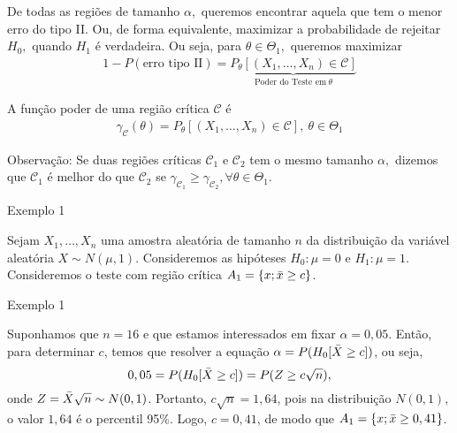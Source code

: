 \documentclass[12pt]{beamer}
\begin{document}
\begin{frame}{}
\begin{block}{}
\justifying
De todas as regiões de tamanho $\alpha,$ queremos encontrar aquela que tem o menor erro do tipo II. Ou, de forma equivalente, maximizar a probabilidade de rejeitar $H_{0},$ quando $H_{1}$ é verdadeira. Ou seja, para $\theta\in\Theta_{1},$ queremos maximizar 
\begin{align*}
    1-P(\text{erro tipo II})=\underbrace{P_{\theta}[(X_{1},\ldots,X_{n})\in\mathcal{C}]}_{\text{Poder do Teste em}~\theta}
\end{align*}
\end{block}
\end{frame}

\begin{frame}{}
\begin{definicao}
\justifying
A função poder de uma região crítica $\mathcal{C}$ é 
\begin{align*}
    \gamma_{\mathcal{C}}(\theta)=P_{\theta}[(X_{1},\ldots,X_{n})\in\mathcal{C}],~\theta\in \Theta_{1}
\end{align*}
\end{definicao}
\pause
\begin{block}{Observação:}
\justifying
Se duas regiões críticas $\mathcal{C}_{1}$ e $\mathcal{C}_{2}$ tem o mesmo tamanho $\alpha,$ dizemos que $\mathcal{C}_{1}$ é melhor do que $\mathcal{C}_{2}$ se $\gamma_{\mathcal{C}_{1}}\geq \gamma_{\mathcal{C}_{2}}, \forall \theta\in\Theta_{1}.$
\end{block}
\end{frame}

\begin{frame}{Exemplo 1}
\begin{block}{}
\justifying
Sejam \(X_1, \ldots , X_n\) uma amostra aleatória de tamanho \(n\) da distribuição da variável aleatória \(X \sim N(\mu, 1)\). Consideremos as hipóteses \(H_0 : \mu = 0\) e \(H_1 : \mu = 1\). Consideremos o teste com região crítica \(A_1 = \{x; \Bar{x} \geq c\}\).
\end{block}
\end{frame}

\begin{frame}{Exemplo 1}
\begin{block}{}
\justifying
Suponhamos que \(n = 16\) e que estamos interessados em fixar \(\alpha = 0,05\). Então, para determinar \(c\), temos que resolver a equação \(\alpha = P(H_0 [\Bar{X} \geq c])\), ou seja,
\[
0,05 = P(H_0 [\Bar{X}\geq c]) = P(Z \geq c\sqrt{n}),
\]
onde \(Z = \Bar{X}\sqrt{n} \sim N(0, 1)\). Portanto, \(c\sqrt{n} = 1,64\), pois na distribuição \(N(0,1)\), o valor \(1,64\) é o percentil 95\%. Logo, \(c = 0,41\), de modo que \(A_1 = \{x; \Bar{x} \geq 0,41\}\).

\end{block}
\end{frame}
\end{document}
